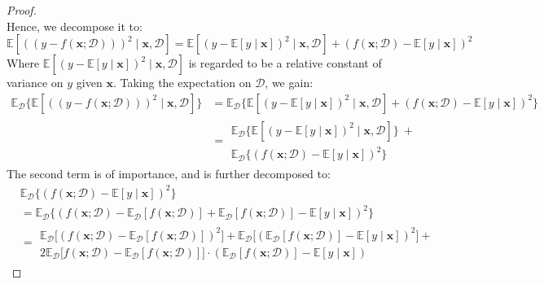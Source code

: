 \documentclass[10pt]{article} %
\begin{document}
\begin{proof}
\begin{equation}
    \end{equation}
    Hence, we decompose it to: 
    \begin{equation}
        \mathbb{E} \left[((y-f(\mathbf{x};\mathcal{D})))^{2}\mid \mathbf{x}, \mathcal{D}\right] = \mathbb{E}\left[(y-\mathbb{E}[y\mid \mathbf{x}])^{2}\mid \mathbf{x},\mathcal{D}\right] + (f(\mathbf{x};\mathcal{D})-\mathbb{E}[y\mid \mathbf{x}])^{2}
    \end{equation}
    Where $\mathbb{E}\left[(y-\mathbb{E}[y\mid \mathbf{x}])^{2}\mid \mathbf{x},\mathcal{D}\right]$ is regarded to be a relative constant of variance on $y$ given $\mathbf{x}$. Taking the expectation on $\mathcal{D}$, we gain: 
    \begin{equation}
        \begin{split}
            \mathbb{E}_{\mathcal{D}} \Big\{ \mathbb{E} \left[((y-f(\mathbf{x};\mathcal{D})))^{2}\mid \mathbf{x}, \mathcal{D}\right]\Big\} & = \mathbb{E}_{\mathcal{D}} \Big\{\mathbb{E}\left[(y-\mathbb{E}[y\mid \mathbf{x}])^{2}\mid \mathbf{x},\mathcal{D}\right] + (f(\mathbf{x};\mathcal{D})-\mathbb{E}[y\mid \mathbf{x}])^{2}\Big\}\\
            & = \begin{multlined}
                \mathbb{E}_{\mathcal{D}} \Big\{ \mathbb{E}\left[(y-\mathbb{E}[y\mid \mathbf{x}])^{2}\mid \mathbf{x},\mathcal{D}\right]\Big\} \: + \\ \mathbb{E}_{\mathcal{D}} \Big\{ (f(\mathbf{x};\mathcal{D})-\mathbb{E}[y\mid \mathbf{x}])^{2}\Big\}
            \end{multlined}
        \end{split}
    \end{equation}
    The second term is of importance, and is further decomposed to: 
    \begin{equation}
        \begin{split}
            & \mathbb{E}_{\mathcal{D}} \Big\{ (f(\mathbf{x};\mathcal{D})-\mathbb{E}[y\mid \mathbf{x}])^{2}\Big\} \\ 
            & = \mathbb{E}_{\mathcal{D}} \Big\{ (f(\mathbf{x};\mathcal{D})- \mathbb{E}_{\mathcal{D}}[f(\mathbf{x};\mathcal{D})] + \mathbb{E}_{\mathcal{D}}[f(\mathbf{x};\mathcal{D})] -\mathbb{E}[y\mid \mathbf{x}])^{2}\Big\} \\
            & = \begin{multlined}
                \mathbb{E}_{\mathcal{D}} \Big[(f(\mathbf{x};\mathcal{D})-\mathbb{E}_{\mathcal{D}}[f(\mathbf{x};\mathcal{D})])^{2}\Big] + \mathbb{E}_{\mathcal{D}} \Big[ (\mathbb{E}_{\mathcal{D}} [f(\mathbf{x};\mathcal{D})] - \mathbb{E}[y\mid \mathbf{x}])^{2} \Big] + \\2\mathbb{E}_{\mathcal{D}}\Big[f(\mathbf{x};\mathcal{D})-\mathbb{E}_{\mathcal{D}}[f(\mathbf{x};\mathcal{D})]\Big]\cdot (\mathbb{E}_{\mathcal{D}}[f(\mathbf{x};\mathcal{D})]-\mathbb{E}[y\mid \mathbf{x}])

\end{multlined}
\end{split}
\end{equation}
\end{proof}
\end{document}

